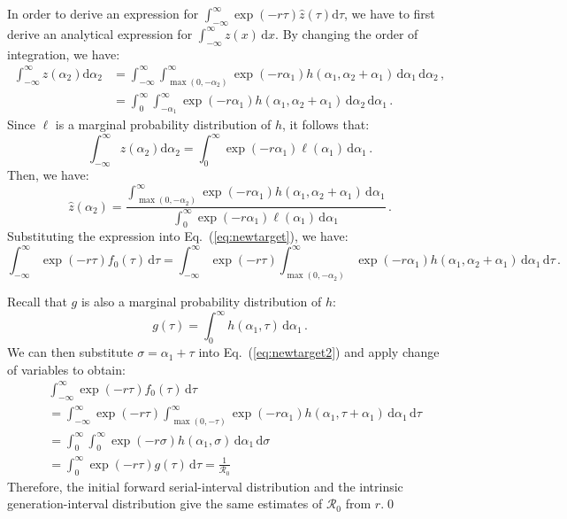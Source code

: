 \documentclass[12pt]{article}
\newcommand{\eref}[1]{Eq.~(\ref{eq:#1})}
\newcommand{\Rx}[1]{\ensuremath{{\mathcal R}_{#1}}\xspace}
\newcommand{\Ro}{\Rx{0}}
\newcommand{\dd}[1]{\ensuremath{\, \mathrm{d}#1}}
\newcommand{\dtau}{\dd{\tau}}
\newcommand{\dx}{\dd{x}}
\newcommand{\pinf}{\ensuremath{\alpha_1}} %
\newcommand{\sinf}{\ensuremath{\alpha_2}} %
\newcommand{\idist}{\ell} %
\begin{document}
In order to derive an expression for $\int_{-\infty}^\infty \exp(-r\tau) \hat{z}(\tau) \mathrm{d} \tau$, we have to first derive an analytical expression for $\int_{-\infty}^\infty z(x) \dx$. By changing the order of integration, we have:
\begin{align}
\int_{-\infty}^\infty z(\sinf) \mathrm{d}\sinf &= \int_{-\infty}^\infty \int_{\max{(0,-\sinf)}}^{\infty} \exp(-r\pinf) h(\pinf, \sinf + \pinf)\, \mathrm{d}\pinf \,\mathrm{d}\sinf\nonumber\,,\\
&= \int_{0}^\infty \int_{-\pinf}^\infty \exp(- r \pinf) h(\pinf, \sinf+\pinf)\, \mathrm{d}\sinf\,\mathrm{d} \pinf\,.
\end{align}
Since $\idist$ is a marginal probability distribution of $h$, it follows that:
\begin{equation}
\int_{-\infty}^\infty z(\sinf) \mathrm{d}\sinf = \int_{0}^\infty \exp(- r \pinf) \idist(\pinf)\, \mathrm{d}\pinf\,.
\end{equation}
Then, we have:
\begin{equation}
\hat{z}(\sinf) = \frac{\int_{\max{(0,-\sinf)}}^{\infty} \exp(-r\pinf) h(\pinf, \sinf + \pinf)\, \mathrm{d}\pinf}{\int_{0}^\infty \exp(- r \pinf) \idist(\pinf)\, \mathrm{d}\pinf}\,.
\end{equation}
Substituting the expression into \eref{newtarget}, we have:
\begin{equation}
\int_{-\infty}^\infty \exp(-r\tau) f_{0}(\tau)\dtau = \int_{-\infty}^\infty \exp(-r\tau) \int_{\max{(0,-\sinf)}}^{\infty} \exp(-r\pinf) h(\pinf, \sinf + \pinf)\, \mathrm{d}\pinf \dtau\,.
\label{eq:newtarget2}
\end{equation}

Recall that $g$ is also a marginal probability distribution of $h$:
\begin{equation}
g(\tau) = \int_0^\infty h(\pinf, \tau) \,\mathrm{d} \pinf\,.
\end{equation}
We can then substitute $\sigma = \pinf + \tau$ into \eref{newtarget2} and apply change of variables to obtain:
\begin{align}
&\int_{-\infty}^\infty \exp(-r\tau) f_{0}(\tau)\dtau\\
&=\int_{-\infty}^{\infty} \exp(-r\tau) \int_{\max(0, -\tau)}^\infty \exp(- r \pinf) h(\pinf, \tau+\pinf) \,\mathrm{d} \pinf \dtau\nonumber\\
&=\int_{0}^{\infty} \int_{0}^\infty \exp(- r \sigma) h(\pinf, \sigma)\, \mathrm{d} \pinf\, \mathrm{d}\sigma\nonumber\\
&=\int_{0}^{\infty} \exp(-r\tau) g(\tau) \dtau =\frac{1}{\Ro}
\end{align}
Therefore, the initial forward serial-interval distribution and the intrinsic generation-interval distribution give the same estimates of \Ro from $r$.\qed
\end{document}
